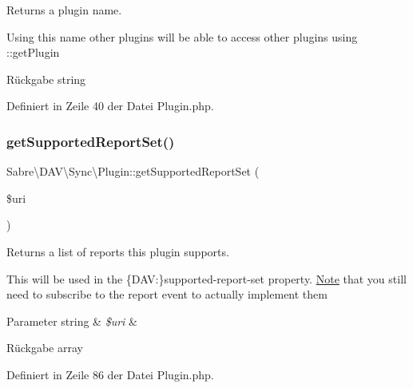 Returns a plugin name.

Using this name other plugins will be able to access other plugins using \+::get\+Plugin

\begin{DoxyReturn}{Rückgabe}
string 
\end{DoxyReturn}


Definiert in Zeile 40 der Datei Plugin.\+php.

\mbox{\label{class_sabre_1_1_d_a_v_1_1_sync_1_1_plugin_a05039bf63ca9db884f093af0882cf7b7}} 
\subsubsection{\texorpdfstring{get\+Supported\+Report\+Set()}{getSupportedReportSet()}}
{\footnotesize\ttfamily Sabre\textbackslash{}\+D\+A\+V\textbackslash{}\+Sync\textbackslash{}\+Plugin\+::get\+Supported\+Report\+Set (\begin{DoxyParamCaption}\item[{}]{\$uri }\end{DoxyParamCaption})}

Returns a list of reports this plugin supports.

This will be used in the \{D\+AV\+:\}supported-\/report-\/set property. \mbox{\hyperlink{class_note}{Note}} that you still need to subscribe to the \textquotesingle{}report\textquotesingle{} event to actually implement them


\begin{DoxyParams}[1]{Parameter}
string & {\em \$uri} & \\
\hline
\end{DoxyParams}
\begin{DoxyReturn}{Rückgabe}
array 
\end{DoxyReturn}


Definiert in Zeile 86 der Datei Plugin.\+php.

\mbox{\label{class_sabre_1_1_d_a_v_1_1_sync_1_1_plugin_a24ff1a4748ba92538d987bab9ffbbc49}} 
